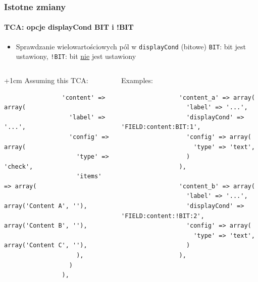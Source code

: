 
\begin{frame}[fragile]
	\frametitle{Istotne zmiany}
	\framesubtitle{TCA: opcje displayCond BIT i !BIT}

	\lstset{
		basicstyle=\tiny\ttfamily
	}

	\begin{itemize}
		\item Sprawdzanie wielowartościowych pól w \texttt{displayCond} (bitowe)\newline
			\texttt{BIT}: bit jest ustawiony, \texttt{!BIT}: bit \underline{nie} jest ustawiony
	\end{itemize}

	\begin{columns}[T]

		\begin{column}{.5\textwidth}

			\advance\leftskip+1cm
			Assuming this TCA:

			\lstset{xleftmargin=1cm}

			\begin{lstlisting}
				'content' => array(
				  'label' => '...',
				  'config' => array(
				    'type' => 'check',
				    'items' => array(
				      array('Content A', ''),
				      array('Content B', ''),
				      array('Content C', ''),
				    ),
				  )
				),
			\end{lstlisting}

		\end{column}
		\begin{column}{.5\textwidth}

			Examples:

			\begin{lstlisting}
				'content_a' => array(
				  'label' => '...',
				  'displayCond' => 'FIELD:content:BIT:1',
				  'config' => array(
				    'type' => 'text',
				  )
				),

				'content_b' => array(
				  'label' => '...',
				  'displayCond' => 'FIELD:content:!BIT:2',
				  'config' => array(
				    'type' => 'text',
				  )
				),
			\end{lstlisting}
		\end{column}

	\end{columns}

\end{frame}

